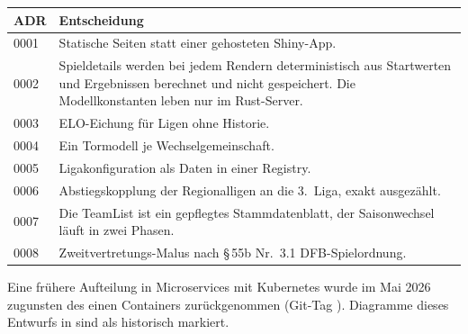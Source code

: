 \begin{center}
\small
\begin{tabularx}{\textwidth}{@{}lX@{}}
\toprule
ADR & Entscheidung \\
\midrule
0001 & Statische Seiten statt einer gehosteten Shiny-App. \\
0002 & Spieldetails werden bei jedem Rendern deterministisch aus Startwerten und Ergebnissen berechnet und nicht gespeichert. Die Modellkonstanten leben nur im Rust-Server. \\
0003 & ELO-Eichung für Ligen ohne Historie. \\
0004 & Ein Tormodell je Wechselgemeinschaft. \\
0005 & Ligakonfiguration als Daten in einer Registry. \\
0006 & Abstiegskopplung der Regionalligen an die 3.~Liga, exakt ausgezählt. \\
0007 & Die TeamList ist ein gepflegtes Stammdatenblatt, der Saisonwechsel läuft in zwei Phasen. \\
0008 & Zweitvertretungs-Malus nach §\,55b Nr.~3.1 DFB-Spielordnung. \\
\bottomrule
\end{tabularx}
\end{center}

Eine frühere Aufteilung in Microservices mit Kubernetes wurde im Mai 2026
zugunsten des einen Containers zurückgenommen (Git-Tag
). Diagramme dieses Entwurfs in
 sind als historisch markiert.
